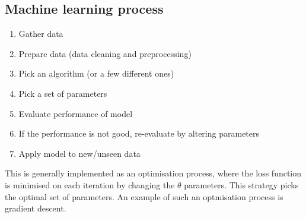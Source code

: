 \documentclass[CS5104-Notes.tex]{subfiles}
\begin{document}
\subsection{Machine learning process}
\begin{enumerate}
  \item Gather data
  \item Prepare data (data cleaning and preprocessing)
  \item Pick an algorithm (or a few different ones)
  \item Pick a set of parameters
  \item Evaluate performance of model
  \item If the performance is not good, re-evaluate by altering parameters
  \item Apply model to new/unseen data
\end{enumerate}
This is generally implemented as an optimisation process, where the loss function is minimised on each iteration by changing the $\theta$ parameters. This strategy picks the optimal set of parameters. An example of such an optmisation process is gradient descent.
\end{document}
